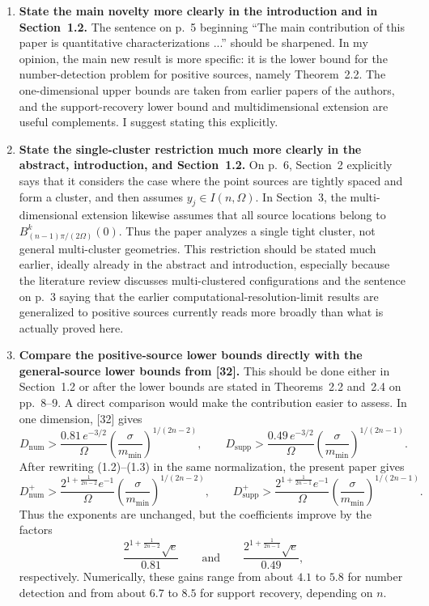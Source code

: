 \documentclass[11pt]{article}
\begin{document}
\begin{enumerate}[leftmargin=2.2em]
\item \textbf{State the main novelty more clearly in the introduction and in Section~1.2.}
The sentence on p.~5 beginning ``The main contribution of this paper is quantitative
characterizations ...'' should be sharpened. In my opinion, the main new result is more specific:
it is the lower bound for the number-detection problem for positive sources, namely
Theorem~2.2. The one-dimensional upper bounds are taken from earlier papers of the authors, and
the support-recovery lower bound and multidimensional extension are useful complements. I suggest
stating this explicitly.

\item \textbf{State the single-cluster restriction much more clearly in the abstract,
introduction, and Section~1.2.}
On p.~6, Section~2 explicitly says that it considers the case where the point sources are tightly
spaced and form a cluster, and then assumes $y_j\in I(n,\Omega)$. In Section~3, the
multi-dimensional extension likewise assumes that all source locations belong to
$B_{(n-1)\pi/(2\Omega)}^k(0)$. Thus the paper analyzes a single tight cluster, not general
multi-cluster geometries. This restriction should be stated much earlier, ideally already in the
abstract and introduction, especially because the literature review discusses multi-clustered
configurations and the sentence on p.~3 saying that the earlier computational-resolution-limit
results are generalized to positive sources currently reads more broadly than what is actually
proved here.

\item \textbf{Compare the positive-source lower bounds directly with the general-source lower
bounds from [32].} This should be done either in Section~1.2 or after the lower bounds are stated
in Theorems~2.2 and~2.4 on pp.~8--9. A direct comparison would make the contribution
easier to assess. In one dimension, [32] gives
\[
D_{\mathrm{num}}>\frac{0.81\,e^{-3/2}}{\Omega}
\left(\frac{\sigma}{m_{\min}}\right)^{1/(2n-2)},
\qquad
D_{\mathrm{supp}}>\frac{0.49\,e^{-3/2}}{\Omega}
\left(\frac{\sigma}{m_{\min}}\right)^{1/(2n-1)}.
\]
After rewriting (1.2)--(1.3) in the same normalization, the present paper gives
\[
D_{\mathrm{num}}^{+}>\frac{2^{1+\frac{1}{2n-2}}e^{-1}}{\Omega}
\left(\frac{\sigma}{m_{\min}}\right)^{1/(2n-2)},
\qquad
D_{\mathrm{supp}}^{+}>\frac{2^{1+\frac{1}{2n-1}}e^{-1}}{\Omega}
\left(\frac{\sigma}{m_{\min}}\right)^{1/(2n-1)}.
\]
Thus the exponents are unchanged, but the coefficients improve by the factors
\[
\frac{2^{1+\frac{1}{2n-2}}\sqrt e}{0.81}
\qquad\text{and}\qquad
\frac{2^{1+\frac{1}{2n-1}}\sqrt e}{0.49},
\]
respectively. Numerically, these gains range from about $4.1$ to $5.8$ for number detection and
from about $6.7$ to $8.5$ for support recovery, depending on $n$.


\end{enumerate}
\end{document}
